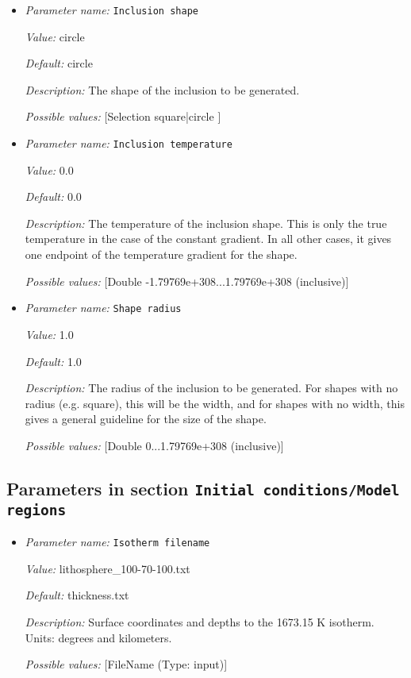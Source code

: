 \begin{itemize}
{\it Description:} The gradient of the inclusion to be generated.


{\it Possible values:} [Selection gaussian|linear|constant ]
\item {\it Parameter name:} {\tt Inclusion shape}


{\it Value:} circle


{\it Default:} circle


{\it Description:} The shape of the inclusion to be generated.


{\it Possible values:} [Selection square|circle ]
\item {\it Parameter name:} {\tt Inclusion temperature}


{\it Value:} 0.0


{\it Default:} 0.0


{\it Description:} The temperature of the inclusion shape. This is only the true temperature in the case of the constant gradient. In all other cases, it gives one endpoint of the temperature gradient for the shape.


{\it Possible values:} [Double -1.79769e+308...1.79769e+308 (inclusive)]
\item {\it Parameter name:} {\tt Shape radius}


{\it Value:} 1.0


{\it Default:} 1.0


{\it Description:} The radius of the inclusion to be generated. For shapes with no radius (e.g. square), this will be the width, and for shapes with no width, this gives a general guideline for the size of the shape.


{\it Possible values:} [Double 0...1.79769e+308 (inclusive)]
\end{itemize}

\subsection{Parameters in section \tt Initial conditions/Model regions}
\label{parameters:Initial_20conditions/Model_20regions}

\begin{itemize}
\item {\it Parameter name:} {\tt Isotherm filename}


{\it Value:} lithosphere_100-70-100.txt


{\it Default:} thickness.txt


{\it Description:} Surface coordinates and depths to the 1673.15 K isotherm. Units: degrees and kilometers.


{\it Possible values:} [FileName (Type: input)]
\end{itemize}


